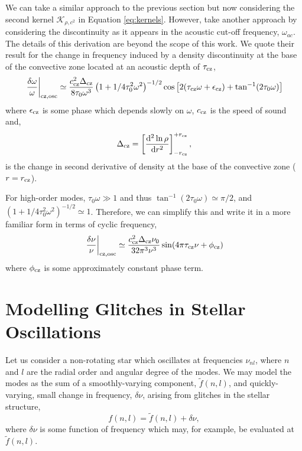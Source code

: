 We can take a similar approach to the previous section but now considering the second kernel \(\mathcal{K}_{\rho,c^2}\) in Equation \ref{eq:kernels}. However, \citet{Houdek.Gough2007} take another approach by considering the discontinuity as it appears in the acoustic cut-off frequency, \(\omega_{ac}\). The details of this derivation are beyond the scope of this work. We quote their result for the change in frequency induced by a density discontinuity at the base of the convective zone located at an acoustic depth of \(\tau_{{\mathrm{cz}}}\),
%
\begin{equation}
    \left.\frac{\delta\omega}{\omega}\right|_{{\mathrm{cz}},\mathrm{osc}} \simeq \frac{c_{{\mathrm{cz}}}^2\Delta_{{\mathrm{cz}}}}{8\tau_0 \omega^3} \left(1 + {1}/{4\tau_0^2\omega^2}\right)^{-1/2} \cos\left[2(\tau_{{\mathrm{cz}}} \omega + \epsilon_{{\mathrm{cz}}}) + \tan^{-1}(2\tau_0\omega)\right]
\end{equation}
%
where \(\epsilon_{{\mathrm{cz}}}\) is some phase which depends slowly on \(\omega\), \(c_{{\mathrm{cz}}}\) is the speed of sound and,
%
\begin{equation}
    \Delta_{{\mathrm{cz}}} = \left[\frac{\mathrm{d}^2 \ln\rho}{\mathrm{d} r^2}\right]_{-r_{{\mathrm{cz}}}}^{+r_{{\mathrm{cz}}}},
\end{equation}
%
is the change in second derivative of density at the base of the convective zone (\(r = r_{{\mathrm{cz}}}\)).

For high-order modes, \(\tau_0 \omega \gg 1\) and thus \(\tan^{-1}(2\tau_0\omega) \simeq \pi/2\), and \((1 + {1}/{4\tau_0^2\omega^2})^{-1/2} \simeq 1\). Therefore, we can simplify this and write it in a more familiar form in terms of cyclic frequency,
%
\begin{equation}
    \left.\frac{\delta\nu}{\nu}\right|_{{\mathrm{cz}},\mathrm{osc}} \simeq \frac{c_{{\mathrm{cz}}}^2\Delta_{{\mathrm{cz}}}\nu_0}{32\pi^3 \nu^3} \sin(4\pi\tau_{{\mathrm{cz}}}\nu + \phi_{{\mathrm{cz}}}) \label{eq:bcz-osc}
\end{equation}
%
where \(\phi_{{\mathrm{cz}}}\) is some approximately constant phase term.

\section[Modelling the Glitch]{Modelling Glitches in Stellar Oscillations}\label{sec:glitch-model}

Let us consider a non-rotating star which oscillates at frequencies \(\nu_{nl}\), where \(n\) and \(l\) are the radial order and angular degree of the modes. We may model the modes as the sum of a smoothly-varying component, \(\tilde{f}(n, l)\), and quickly-varying, small change in frequency, \(\delta\nu\), arising from glitches in the stellar structure,
%
\begin{equation}
    f(n, l) = \tilde{f}(n, l) + \delta\nu,\label{eq:general-glitch}
\end{equation}
%
where \(\delta\nu\) is some function of frequency which may, for example, be evaluated at \(\tilde{f}(n, l)\).

